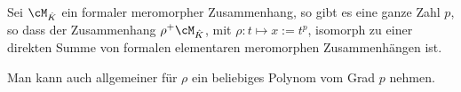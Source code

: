 \begin{thm}
\label{thm:LT}
Sei $\cM_{\hat K}$ ein formaler meromorpher Zusammenhang, so gibt es eine
ganze Zahl $p$, so dass der Zusammenhang $\rho^+\cM_{\hat K}$, mit
$\rho:t\mapsto x:=t^p$, isomorph zu einer direkten Summe von formalen
elementaren meromorphen Zusammenhängen ist.
\begin{comment}
\cite[Thm 5.4.7]{sabbah_cimpa90}
\end{comment}
\end{thm}
\begin{bem}
Man kann auch allgemeiner für $\rho$ ein beliebiges Polynom vom Grad $p$
nehmen.
\end{bem}
\begin{comment}
Der folgende Beweis stammt hauptsächlich aus \cite[Seite 35]{sabbah_cimpa90}.
\end{comment}
